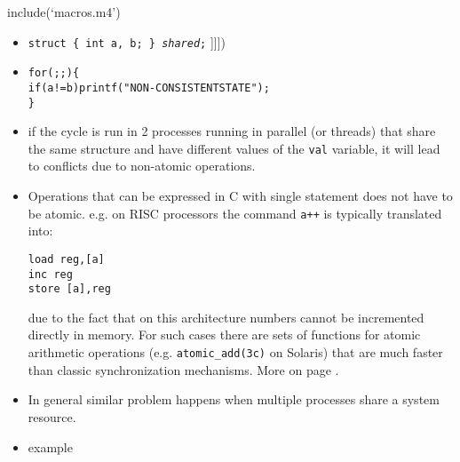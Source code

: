 include(`macros.m4')

\pagebreak
{}

\begin{slide}
\end{slide}



\begin{slide}
\begin{itemize}
ifdef([[[NOSPELLCHECK]]], [[[
\item \texttt{struct \{ int a, b; \} \emph{shared};}
]]])
\item
\begin{alltt}
for( ; ; ) \{
    if (a != b) printf("NON-CONSISTENT STATE");
\} 
\end{alltt}
\item if the cycle is run in 2 processes running in parallel (or threads)
that share the same structure and have different values of the
\texttt{val} variable, it will lead to conflicts due to non-atomic operations.
\end{itemize}
\end{slide}

\label{SYNCHRONIZATION}

\begin{itemize}
\item Operations that can be expressed in C with single statement does not
have to be atomic. e.g. on RISC processors the command \verb.a++.
is typically translated into:

\begin{verbatim}
load reg,[a]
inc reg
store [a],reg
\end{verbatim}

due to the fact that on this architecture numbers cannot be incremented
directly in memory. For such cases there are sets of functions for atomic
arithmetic operations (e.g. \texttt{atomic\_add(3c)} on Solaris) that are
much faster than classic synchronization mechanisms.
More on page \pageref{ATOMIC_ADD}.
\item In general similar problem happens when multiple processes share a 
system resource.
\item \label{RACE_C} example 
\end{itemize}

